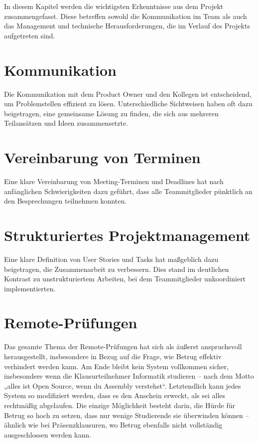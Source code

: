 In diesem Kapitel werden die wichtigsten Erkenntnisse aus dem Projekt zusammengefasst. 
Diese betreffen sowohl die Kommunikation im Team als auch das Management und technische Herausforderungen, die im Verlauf des Projekts aufgetreten sind.

\section{Kommunikation} 
Die Kommunikation mit dem Product Owner und den Kollegen ist entscheidend, um Problemstellen effizient zu lösen. 
Unterschiedliche Sichtweisen haben oft dazu beigetragen, eine gemeinsame Lösung zu finden, die sich aus mehreren Teilansätzen und Ideen zusammensetzte.

\section{Vereinbarung von Terminen} 
Eine klare Vereinbarung von Meeting-Terminen und Deadlines hat nach anfänglichen Schwierigkeiten dazu geführt, dass alle Teammitglieder pünktlich an den Besprechungen teilnehmen konnten.

\section{Strukturiertes Projektmanagement} 
Eine klare Definition von User Stories und Tasks hat maßgeblich dazu beigetragen, die Zusammenarbeit zu verbessern. 
Dies stand im deutlichen Kontrast zu unstrukturiertem Arbeiten, bei dem Teammitglieder unkoordiniert implementierten.

\section{Remote-Prüfungen} 
Das gesamte Thema der Remote-Prüfungen hat sich als äußerst anspruchsvoll herausgestellt, insbesondere in Bezug auf die Frage, wie Betrug effektiv verhindert werden kann. 
Am Ende bleibt kein System vollkommen sicher, insbesondere wenn die Klausurteilnehmer Informatik studieren – nach dem Motto „alles ist Open Source, wenn du Assembly verstehst“. 
Letztendlich kann jedes System so modifiziert werden, dass es den Anschein erweckt, als sei alles rechtmäßig abgelaufen. 
Die einzige Möglichkeit besteht darin, die Hürde für Betrug so hoch zu setzen, dass nur wenige Studierende sie überwinden können – ähnlich wie bei Präsenzklausuren, wo Betrug ebenfalls nicht vollständig ausgeschlossen werden kann.

